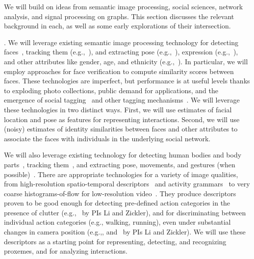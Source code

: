 \label{sec:background}

We will build on ideas from semantic image processing, social sciences, network analysis, and signal processing on graphs. This section discusses the relevant background in each, as well as some early explorations of their intersection.

. We will leverage existing semantic image processing technology for detecting faces~\cite{ViolaJones,Zhang:detect}, tracking them (e.g.,~\cite{Comaniciu:track}), and extracting pose (e.g.,~\cite{Hanson,Murphy-Chutorian:pose}), expression (e.g.,~\cite{Matthews:AAM,delaTorre:expression,Essa:expression}), and other attributes like gender, age, and ethnicity (e.g.,~\cite{LNCS53050340, Gender, Age}).  In particular, we will employ approaches for face verification \cite{ChopraVerification,Kumar09attributeand,DeepFace} to compute similarity scores between faces. These technologies are imperfect, but performance is at useful levels thanks to exploding photo collections, public demand for applications, and the emergence of social tagging~\cite{Stone2008,Stone2010} and other tagging mechanisms~\cite{berg2004naf,berg2005sp,Everingham06a,huang:lfw,YangBKR12}. We will leverage these technologies in two distinct ways. First, we will use estimates of facial location and pose as features for representing interactions. Second, we will use (noisy) estimates of identity similarities between faces and other attributes to associate the faces with individuals in the underlying social network. 

We will also leverage existing technology for detecting human bodies and body parts~\cite{Dalal:HOG,poselet,pose_part}, tracking them~\cite{RamananFZ07,EshelM10}, and extracting pose, movements, and gestures (when possible)~\cite{Mitra:gesture,Ryoo:action,Poppe}. There are appropriate technologies for a variety of image qualities, from high-resolution spatio-temporal descriptors~\cite{Dollar:STIP,Laptev:STIP,Brox:flow} and activity grammars~\cite{Niebles2007,Niebles2006} to very coarse histograms-of-flow for low-resolution video~\cite{EfrosBMM03}. They produce descriptors proven to be good enough for detecting pre-defined action categories in the presence of clutter (e.g.,~\cite{groupdet2013, Li2010} by PIs Li and Zickler), and for discriminating between individual action categories (e.g., walking, running), even under substantial changes in camera position (e.g.,\cite{Weinland:invariance2}, and~\cite{LiZickler2012} by PIs Li and Zickler). We will use these descriptors as a starting point for representing, detecting, and recognizing proxemes, and for analyzing interactions.

